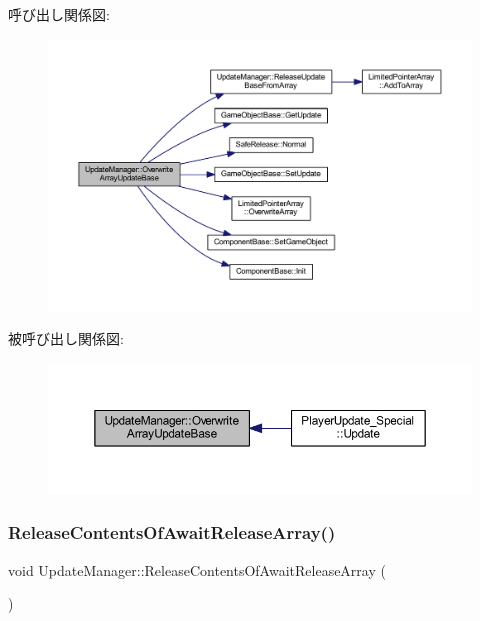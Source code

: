 呼び出し関係図\+:
\nopagebreak
\begin{figure}[H]
\begin{center}
\leavevmode
\includegraphics[width=350pt]{class_update_manager_ab4f492c33ed941ddd01ccae8218080ff_cgraph}
\end{center}
\end{figure}
被呼び出し関係図\+:
\nopagebreak
\begin{figure}[H]
\begin{center}
\leavevmode
\includegraphics[width=350pt]{class_update_manager_ab4f492c33ed941ddd01ccae8218080ff_icgraph}
\end{center}
\end{figure}
\mbox{\label{class_update_manager_ac87db8037fbfb800187c50ca22a1f01d}} 
\subsubsection{\texorpdfstring{Release\+Contents\+Of\+Await\+Release\+Array()}{ReleaseContentsOfAwaitReleaseArray()}}
{\footnotesize\ttfamily void Update\+Manager\+::\+Release\+Contents\+Of\+Await\+Release\+Array (\begin{DoxyParamCaption}{ }\end{DoxyParamCaption})\hspace{0.3cm}{\ttfamily [private]}}



